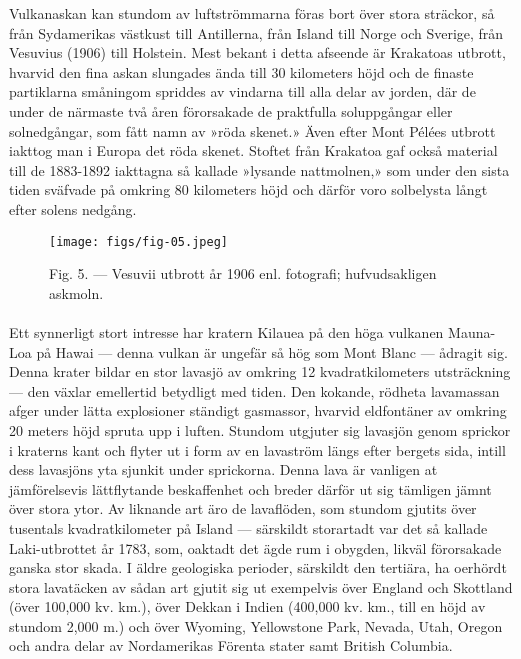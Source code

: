 \documentclass[a4paper, 12pt, oneside, swedish]{article}
\begin{document}
Vulkanaskan kan stundom av luftströmmarna föras bort över stora sträckor, så från Sydamerikas västkust till Antillerna, från Island till Norge och Sverige, från Vesuvius (1906) till Holstein. Mest bekant i detta afseende är Krakatoas utbrott, hvarvid den fina askan slungades ända till 30 kilometers höjd och de finaste partiklarna småningom spriddes av vindarna till alla delar av jorden, där de under de närmaste två åren förorsakade de praktfulla soluppgångar eller solnedgångar, som fått namn av »röda skenet.» Även efter Mont Pélées utbrott iakttog man i Europa det röda skenet. Stoftet från Krakatoa gaf också material till de 1883-1892 iakttagna så kallade »lysande nattmolnen,» som under den sista tiden sväfvade på omkring 80 kilometers höjd och därför voro solbelysta långt efter solens nedgång.

\begin{figure}[H]
\centering
\texttt{[image: figs/fig-05.jpeg]}
\caption{Fig. 5. --- Vesuvii utbrott år 1906 enl. fotografi; hufvudsakligen askmoln.}
\end{figure}
\paragraph{}
Ett synnerligt stort intresse har kratern Kilauea på den höga vulkanen Mauna-Loa på Hawai --- denna vulkan är ungefär så hög som Mont Blanc --- ådragit sig. Denna krater bildar en stor lavasjö av omkring 12 kvadratkilometers utsträckning --- den växlar emellertid betydligt med tiden. Den kokande, rödheta lavamassan afger under lätta explosioner ständigt gasmassor, hvarvid eldfontäner av omkring 20 meters höjd spruta upp i luften. Stundom utgjuter sig lavasjön genom sprickor i kraterns kant och flyter ut i form av en lavaström längs efter bergets sida, intill dess lavasjöns yta sjunkit under sprickorna. Denna lava är vanligen at jämförelsevis lättflytande beskaffenhet och breder därför ut sig tämligen jämnt över stora ytor. Av liknande art äro de lavaflöden, som stundom gjutits över tusentals kvadratkilometer på Island --- särskildt storartadt var det så kallade Laki-utbrottet år 1783, som, oaktadt det ägde rum i obygden, likväl förorsakade ganska stor skada. I äldre geologiska perioder, särskildt den tertiära, ha oerhördt stora lavatäcken av sådan art gjutit sig ut exempelvis över England och Skottland (över 100,000 kv. km.), över Dekkan i Indien (400,000 kv. km., till en höjd av stundom 2,000 m.) och över Wyoming, Yellowstone Park, Nevada, Utah, Oregon och andra delar av Nordamerikas Förenta stater samt British Columbia.
\end{document}
